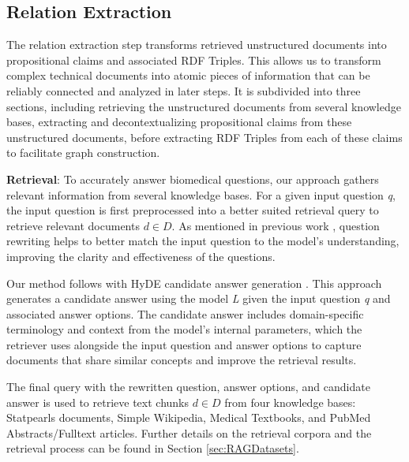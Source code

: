 \documentclass[11pt]{article}
\theoremstyle{definition}
\begin{document}
\subsection{Relation Extraction}\label{sec:relextract}
The relation extraction step transforms retrieved unstructured documents into propositional claims and associated RDF Triples. This allows us to transform complex technical documents into atomic pieces of information that can be reliably connected and analyzed in later steps. It is subdivided into three sections, including retrieving the unstructured documents from several knowledge bases, extracting and decontextualizing propositional claims from these unstructured documents, before extracting RDF Triples from each of these claims to facilitate graph construction.
\newline

\noindent
\textbf{Retrieval}\label{sec:retrieval}: To accurately answer biomedical questions, our approach gathers relevant information from several knowledge bases. For a given input question \textit{q}, the input question is first preprocessed into a better suited retrieval query to retrieve relevant documents $d \in D$. As mentioned in previous work \cite{DBLP:journals/corr/abs-2305-14283}, question rewriting helps to better match the input question to the model's understanding, improving the clarity and effectiveness of the questions. 

Our method follows with HyDE candidate answer generation \cite{gao-etal-2023-precise}. This approach generates a candidate answer using the model \textit{L} given the input question \textit{q} and associated answer options. The candidate answer includes domain-specific terminology and context from the model's internal parameters, which the retriever uses alongside the input question and answer options to capture documents that share similar concepts and improve the retrieval results.

The final query with the rewritten question, answer options, and candidate answer is used to retrieve text chunks $d \in D$ from four knowledge bases: Statpearls documents, Simple Wikipedia, Medical Textbooks, and PubMed Abstracts/Fulltext articles. Further details on the retrieval corpora and the retrieval process can be found in Section \ref{sec:RAGDatasets}.
\\
\end{document}
